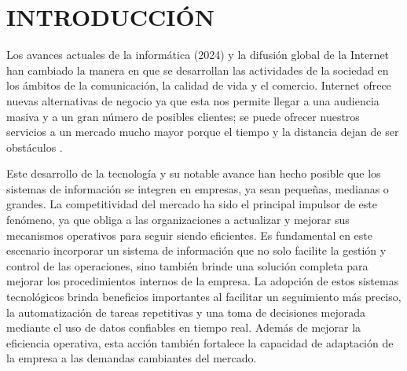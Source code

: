 \chapter{INTRODUCCIÓN}

	\vspace{10pt}

	Los avances actuales de la informática (2024) y la difusión global de la Internet han cambiado la manera en que se desarrollan las actividades de la sociedad en los ámbitos de la comunicación, la calidad de vida y el comercio. Internet ofrece nuevas alternativas de negocio ya que esta nos permite llegar a una audiencia masiva y a un gran número de posibles clientes; se puede ofrecer nuestros servicios a un mercado mucho mayor porque el tiempo y la distancia dejan de ser obstáculos \parencite{anormaliza2009implementacion}.
	
	
	Este desarrollo de la tecnología y su notable avance han hecho posible que los sistemas de información se integren en empresas, ya sean pequeñas, medianas o grandes. La competitividad del mercado ha sido el principal impulsor de este fenómeno, ya que obliga a las organizaciones a actualizar y mejorar sus mecanismos operativos para seguir siendo eficientes. Es fundamental en este escenario incorporar un sistema de información que no solo facilite la gestión y control de las operaciones, sino también brinde una solución completa para mejorar los procedimientos internos de la empresa. La adopción de estos sistemas tecnológicos brinda beneficios importantes al facilitar un seguimiento más preciso, la automatización de tareas repetitivas y una toma de decisiones mejorada mediante el uso de datos confiables en tiempo real. Además de mejorar la eficiencia operativa, esta acción también fortalece la capacidad de adaptación de la empresa a las demandas cambiantes del mercado.
	

